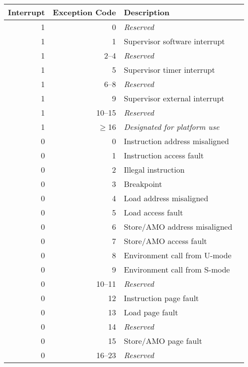 \begin{table*}[h!]
\begin{center}
\begin{tabular}{|r|r|l|l|}

  \hline
  Interrupt & Exception Code  & Description \\
  \hline
  1         & 0               & {\em Reserved} \\
  1         & 1               & Supervisor software interrupt \\
  1         & 2--4            & {\em Reserved} \\
  1         & 5               & Supervisor timer interrupt \\
  1         & 6--8            & {\em Reserved} \\
  1         & 9               & Supervisor external interrupt \\
  1         & 10--15          & {\em Reserved} \\
  1         & $\ge$16         & {\em Designated for platform use} \\ \hline
  0         & 0               & Instruction address misaligned \\
  0         & 1               & Instruction access fault \\
  0         & 2               & Illegal instruction \\
  0         & 3               & Breakpoint \\
  0         & 4               & Load address misaligned \\
  0         & 5               & Load access fault \\
  0         & 6               & Store/AMO address misaligned \\
  0         & 7               & Store/AMO access fault \\
  0         & 8               & Environment call from U-mode \\
  0         & 9               & Environment call from S-mode \\
  0         & 10--11          & {\em Reserved} \\
  0         & 12              & Instruction page fault \\
  0         & 13              & Load page fault \\
  0         & 14              & {\em Reserved} \\
  0         & 15              & Store/AMO page fault \\
  0         & 16--23          & {\em Reserved} \\

\end{tabular}
\end{center}
\end{table*}

